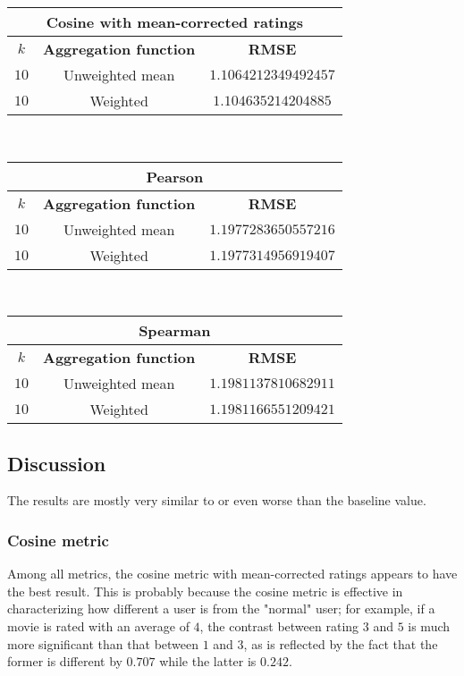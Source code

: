 \documentclass[final]{cvpr}
\begin{document}
\vspace{1em}

\begin{tabular}{| c | c | c |}
    \hline
    \multicolumn{3}{|c|}{\textbf{Cosine with mean-corrected ratings}}\\
    \hline
		$k$ & \textbf{Aggregation function} & \textbf{RMSE}\\
    \hline
    $10$ & Unweighted mean & $1.1064212349492457$\\
    \hline
    $10$ & Weighted & $1.104635214204885$\\
    \hline
\end{tabular}\\

\vspace{1em}

\begin{tabular}{| c | c | c |}
    \hline
    \multicolumn{3}{|c|}{\textbf{Pearson}}\\
    \hline
		$k$ & \textbf{Aggregation function} & \textbf{RMSE}\\
    \hline
    $10$ & Unweighted mean & $1.1977283650557216$\\
    \hline
    $10$ & Weighted & $1.1977314956919407$\\
    \hline
\end{tabular}\\

\vspace{1em}

\begin{tabular}{| c | c | c |}
    \hline
    \multicolumn{3}{|c|}{\textbf{Spearman}}\\
    \hline
		$k$ & \textbf{Aggregation function} & \textbf{RMSE}\\
    \hline
    $10$ & Unweighted mean & $1.1981137810682911$\\
    \hline
    $10$ & Weighted & $1.1981166551209421$\\
    \hline
\end{tabular}

\vspace{1em}

\subsection{Discussion}
The results are mostly very similar to or even worse than the baseline value.

\subsubsection{Cosine metric}
Among all metrics, the cosine metric with mean-corrected ratings
appears to have the best result.
This is probably because the cosine metric is effective in characterizing
how different a user is from the "normal" user;
for example, if a movie is rated with an average of $4$,
the contrast between rating $3$ and $5$ is much more significant than
that between $1$ and $3$,
as is reflected by the fact that the former is different by $0.707$
while the latter is $0.242$.
\end{document}
